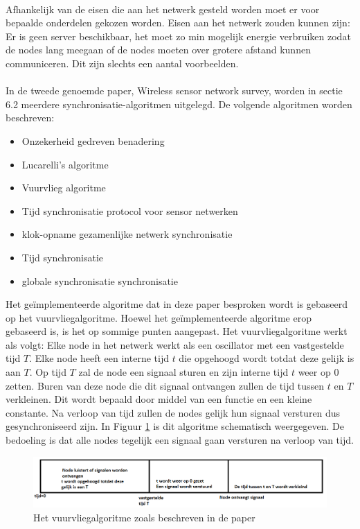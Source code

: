 \documentclass{article}
\begin{document}
\\
Afhankelijk van de eisen die aan het netwerk gesteld worden moet er voor bepaalde onderdelen gekozen worden. Eisen aan het netwerk zouden kunnen zijn: Er is geen server beschikbaar, het moet zo min mogelijk energie verbruiken zodat de nodes lang meegaan of de nodes moeten over grotere afstand kunnen communiceren. Dit zijn slechts een aantal voorbeelden. \\
\\
In de tweede genoemde paper, Wireless sensor network survey, worden in sectie 6.2 meerdere synchronisatie-algoritmen uitgelegd. De volgende algoritmen worden beschreven:
\begin{itemize}
	\item Onzekerheid gedreven benadering
	\item Lucarelli's algoritme
	\item Vuurvlieg algoritme
	\item Tijd synchronisatie protocol voor sensor netwerken
	\item klok-opname gezamenlijke netwerk synchronisatie
	\item Tijd synchronisatie
	\item globale synchronisatie
	synchronisatie 
\end{itemize}
Het ge\"{i}mplementeerde algoritme dat in deze paper besproken wordt is gebaseerd op het vuurvliegalgoritme. Hoewel het ge\"{i}mplementeerde algoritme erop gebaseerd is, is het op sommige punten aangepast. 
Het vuurvliegalgoritme werkt als volgt: 
Elke node in het netwerk werkt als een oscillator met een vastgestelde tijd $T$. Elke node heeft een interne tijd $t$ die opgehoogd wordt totdat deze gelijk is aan $T$. Op tijd $T$ zal de node een signaal sturen en zijn interne tijd $t$ weer op 0 zetten. Buren van deze node die dit signaal ontvangen zullen de tijd tussen $t$ en $T$ verkleinen. Dit wordt bepaald door middel van een functie en een kleine constante. Na verloop van tijd zullen de nodes gelijk hun signaal versturen dus gesynchroniseerd zijn. In Figuur \ref{fig: Firefly} is dit algoritme schematisch weergegeven. De bedoeling is dat alle nodes tegelijk een signaal gaan versturen na verloop van tijd.  
\begin{figure}[h]
\centering\includegraphics[scale=0.5]{Firefly}
\caption{Het vuurvliegalgoritme zoals beschreven in de paper}
\label{fig: Firefly}
\end{figure}
\end{document}
